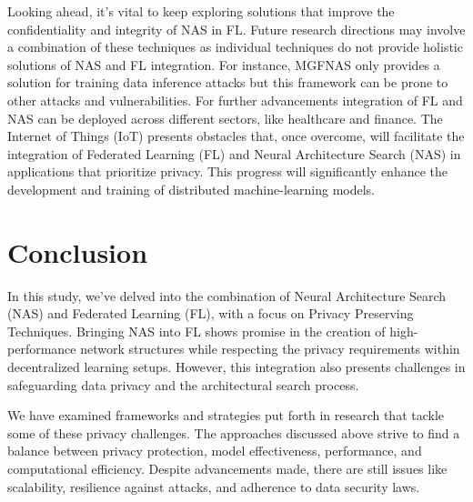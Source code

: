 \documentclass[conference]{IEEEtran}
\begin{document}
Looking ahead, it's vital to keep exploring solutions that improve the confidentiality and integrity of NAS in FL. Future research directions may involve a combination of these techniques as individual techniques do not provide holistic solutions of NAS and FL integration. For instance, MGFNAS only provides a solution for training data inference attacks but this framework can be prone to other attacks and vulnerabilities. For further advancements integration of FL and NAS can be deployed across different sectors, like healthcare and finance. The Internet of Things (IoT) presents obstacles that, once overcome, will facilitate the integration of Federated Learning (FL) and Neural Architecture Search (NAS) in applications that prioritize privacy. This progress will significantly enhance the development and training of distributed machine-learning models.


\section{Conclusion}
In this study, we've delved into the combination of Neural Architecture Search (NAS) and Federated Learning (FL), with a focus on Privacy Preserving Techniques. Bringing NAS into FL shows promise in the creation of high-performance network structures while respecting the privacy requirements within decentralized learning setups. However, this integration also presents challenges in safeguarding data privacy and the architectural search process.

We have examined frameworks and strategies put forth in research that tackle some of these privacy challenges. The approaches discussed above strive to find a balance between privacy protection, model effectiveness, performance, and computational efficiency. Despite advancements made, there are still issues like scalability, resilience against attacks, and adherence to data security laws.




\end{document}
